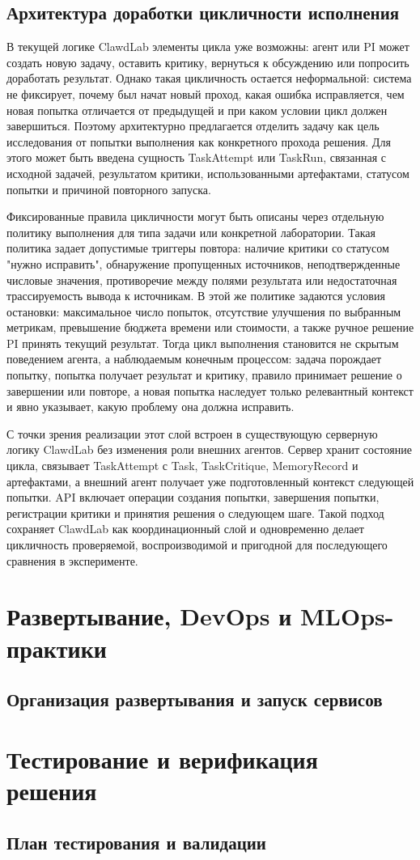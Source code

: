 \subsection{Архитектура доработки цикличности исполнения}

 В текущей логике ClawdLab элементы цикла уже возможны: агент или PI может создать новую задачу, оставить критику, вернуться к обсуждению или попросить доработать результат. Однако такая цикличность остается неформальной: система не фиксирует, почему был начат новый проход, какая ошибка исправляется, чем новая попытка отличается от предыдущей и при каком условии цикл должен завершиться. Поэтому архитектурно предлагается отделить задачу как цель исследования от попытки выполнения как конкретного прохода решения. Для этого может быть введена сущность TaskAttempt или TaskRun, связанная с исходной задачей, результатом критики, использованными артефактами, статусом попытки и причиной повторного запуска.

Фиксированные правила цикличности могут быть описаны через отдельную политику выполнения для типа задачи или конкретной лаборатории. Такая политика задает допустимые триггеры повтора: наличие критики со статусом "нужно исправить", обнаружение пропущенных источников, неподтвержденные числовые значения, противоречие между полями результата или недостаточная трассируемость вывода к источникам. В этой же политике задаются условия остановки: максимальное число попыток, отсутствие улучшения по выбранным метрикам, превышение бюджета времени или стоимости, а также ручное решение PI принять текущий результат. Тогда цикл выполнения становится не скрытым поведением агента, а наблюдаемым конечным процессом: задача порождает попытку, попытка получает результат и критику, правило принимает решение о завершении или повторе, а новая попытка наследует только релевантный контекст и явно указывает, какую проблему она должна исправить.

С точки зрения реализации этот слой встроен в существующую серверную логику ClawdLab без изменения роли внешних агентов. Сервер хранит состояние цикла, связывает TaskAttempt с Task, TaskCritique, MemoryRecord и артефактами, а внешний агент получает уже подготовленный контекст следующей попытки. API включает операции создания попытки, завершения попытки, регистрации критики и принятия решения о следующем шаге. Такой подход сохраняет ClawdLab как координационный слой и одновременно делает цикличность проверяемой, воспроизводимой и пригодной для последующего сравнения в эксперименте.

\section{Развертывание, DevOps и MLOps-практики}

\subsection{Организация развертывания и запуск сервисов}

\section{Тестирование и верификация решения}

\subsection{План тестирования и валидации}
